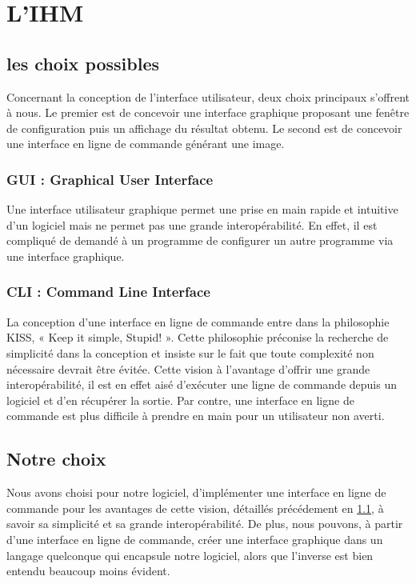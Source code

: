 \section{L'IHM}	
	\subsection{les choix possibles}
	\label{ihm_choix_possibles}
		Concernant la conception de l'interface utilisateur, deux choix principaux s'offrent à nous. Le premier est de concevoir
une interface graphique proposant une fenêtre de configuration puis un affichage du résultat obtenu. Le second est de concevoir 	une interface en ligne de commande générant une image. 	
	
		\subsubsection{GUI : \og Graphical User Interface \fg{}}
			Une interface utilisateur graphique permet une prise en main rapide et intuitive d'un logiciel mais ne permet pas une grande interopérabilité. En effet, il est compliqué de demandé à un programme de configurer un autre programme via une interface graphique.
			
		\subsubsection{CLI : \og Command Line Interface \fg{}}
			La conception d'une interface en ligne de commande entre dans la philosophie KISS, « Keep it simple, Stupid! ». Cette philosophie préconise la recherche de simplicité dans la conception et insiste sur le fait que toute complexité non nécessaire devrait être évitée. Cette vision à l'avantage d'offrir une grande interopérabilité, il est en effet aisé d'exécuter une ligne de commande depuis un logiciel et d'en récupérer la sortie. Par contre, une interface en ligne de commande est plus difficile à prendre en main pour un utilisateur non averti.  
			
	\subsection{Notre choix}
		Nous avons choisi pour notre logiciel, d'implémenter une interface en ligne de commande pour les avantages de cette vision, détaillés précédement en \ref{ihm_choix_possibles}, à savoir sa simplicité et sa grande interopérabilité. De plus, nous pouvons, à partir d'une interface en ligne de commande, créer une interface graphique dans un langage quelconque qui encapsule notre logiciel, alors que l'inverse est bien entendu beaucoup moins évident.


